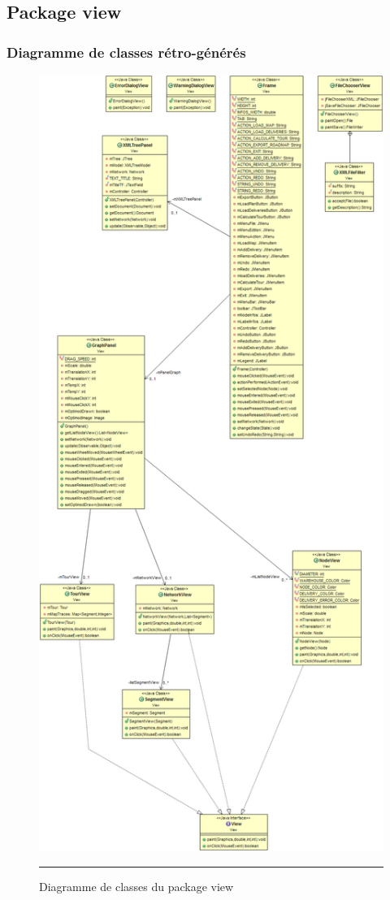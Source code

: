 \subsection{Package view}
\subsubsection{Diagramme de classes rétro-générés}
\begin{figure}[H]
	\centering
		\includegraphics[width=\textwidth,height=\textheight,keepaspectratio]{Figures/retro_view}
		\rule{35em}{0.5pt}
	\caption[Diagramme de classes du package view]{Diagramme de classes du package view}
\end{figure}
